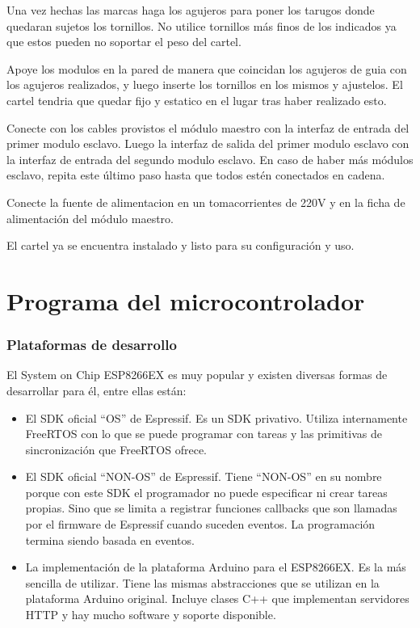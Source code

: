 

Una vez hechas las marcas haga los agujeros para poner los tarugos donde quedaran sujetos los tornillos. No utilice tornillos más finos de los indicados ya que estos pueden no soportar el peso del cartel.


Apoye los modulos en la pared de manera que coincidan los agujeros de guia con los agujeros realizados, y luego inserte los tornillos en los mismos y ajustelos. El cartel tendria que quedar fijo y estatico en el lugar tras haber realizado esto.


Conecte con los cables provistos el módulo maestro con la interfaz de entrada del primer modulo esclavo. Luego la interfaz de salida del primer modulo esclavo con la interfaz de entrada del segundo modulo esclavo. En caso de haber más módulos esclavo, repita este último paso hasta que todos estén conectados en cadena.

Conecte la fuente de alimentacion en un tomacorrientes de 220V y en la ficha de alimentación del módulo maestro.

El cartel ya se encuentra instalado y listo para su configuración y uso.

\section{Programa del microcontrolador} \label{sec:sw-implementacion}

\subsubsection{Plataformas de desarrollo}\label{sec:sdk}
El System on Chip ESP8266EX es muy popular y existen diversas formas de desarrollar para él, entre ellas están:
\begin{itemize}
	\item El SDK oficial \enquote{OS} de Espressif. Es un SDK privativo. Utiliza internamente FreeRTOS con lo que se puede programar con tareas y las primitivas de sincronización que FreeRTOS ofrece.
	\item El SDK oficial \enquote{NON-OS} de Espressif. Tiene \enquote{NON-OS} en su nombre porque con este SDK el programador no puede especificar ni crear tareas propias. Sino que se limita a registrar funciones callbacks que son llamadas por el firmware de Espressif cuando suceden eventos. La programación termina siendo basada en eventos.
	\item La implementación de la plataforma Arduino para el ESP8266EX. Es la más sencilla de utilizar. Tiene las mismas abstracciones que se utilizan en la plataforma Arduino original. Incluye clases C++ que implementan servidores HTTP y hay mucho software y soporte disponible.
\end{itemize}

